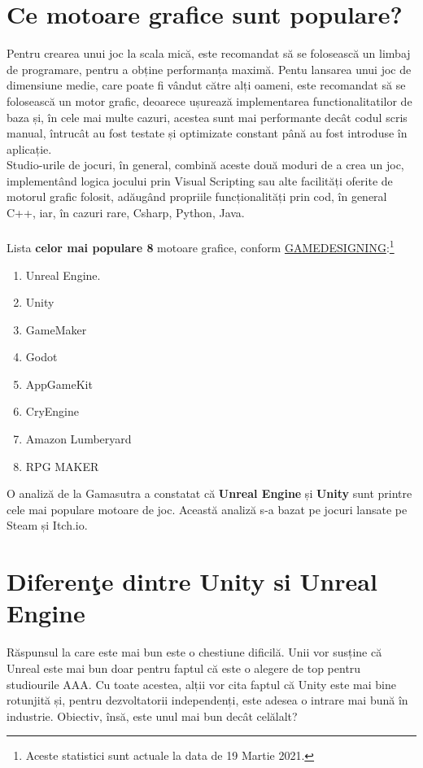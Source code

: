 \documentclass[12pt]{article}
\begin{document}
\newpage
\section{Ce motoare grafice sunt populare?}
Pentru crearea unui joc la scala mică, este recomandat să se folosească un limbaj de programare, pentru a obține performanța maximă. Pentu lansarea unui joc de dimensiune medie, care poate fi vândut către alți oameni, este recomandat să se folosească un motor grafic, deoarece ușurează implementarea functionalitatilor de baza și, în cele mai multe cazuri, acestea sunt mai performante decât codul scris manual, întrucât au fost testate și optimizate constant până au fost introduse în aplicație.\\

Studio-urile de jocuri, în general, combină aceste două moduri de a crea un joc, implementând logica jocului prin Visual Scripting sau alte facilități oferite de motorul grafic folosit, adăugând propriile funcționalități prin cod, în general C++, iar, în cazuri rare, Csharp, Python, Java.\\
\hspace{5pt}\\ Lista {\bf celor mai populare 8} motoare grafice, conform \href{https://www.gamedesigning.org/career/video-game-engines/}{GAMEDESIGNING}:\footnote[1]{Aceste statistici sunt actuale la data de 19 Martie 2021.} 
\begin{enumerate}
  \item Unreal Engine.
  \item Unity
  \item GameMaker
  \item Godot
  \item AppGameKit
  \item CryEngine
  \item Amazon Lumberyard
  \item RPG MAKER \\
\end{enumerate}


O analiză de la Gamasutra a constatat că {\bf Unreal Engine} și {\bf Unity} sunt printre cele mai populare motoare de joc. Această analiză s-a bazat pe jocuri lansate pe Steam și Itch.io.

\newpage
\section{Diferen\c{t}e dintre Unity si Unreal Engine}
Răspunsul la care este mai bun este o chestiune dificilă. Unii vor susține că Unreal este mai bun doar pentru faptul că este o alegere de top pentru studiourile AAA. Cu toate acestea, alții vor cita faptul că Unity este mai bine rotunjită și, pentru dezvoltatorii independenți, este adesea o intrare mai bună în industrie. Obiectiv, însă, este unul mai bun decât celălalt?
\end{document}
